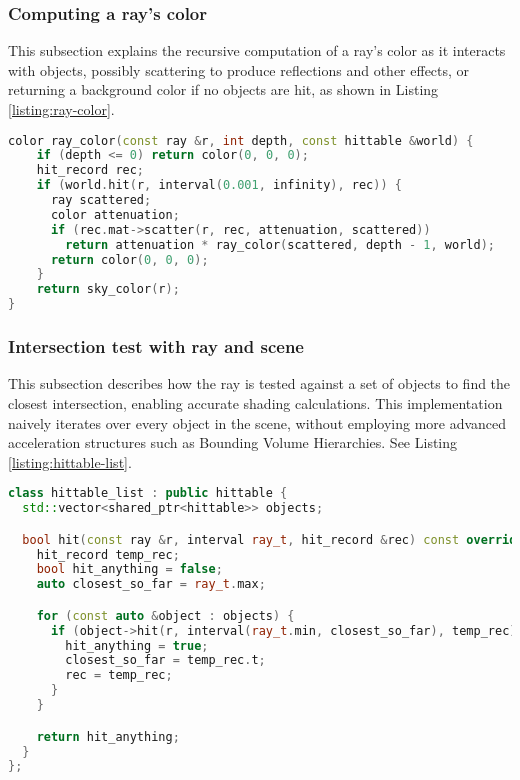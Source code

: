 \FloatBarrier
\subsubsection{Computing a ray's color}
This subsection explains the recursive computation of a ray’s color as it interacts with objects, possibly scattering to produce reflections and other effects, or returning a background color if no objects are hit, as shown in Listing \ref{listing:ray-color}.

\begin{lstlisting}[caption={\textbf{Computing a ray's color}},label={listing:ray-color}, name=ray-color, float=htbp, style=mystyle,language=C++]
color ray_color(const ray &r, int depth, const hittable &world) {
    if (depth <= 0) return color(0, 0, 0);
    hit_record rec;
    if (world.hit(r, interval(0.001, infinity), rec)) {
      ray scattered;
      color attenuation;
      if (rec.mat->scatter(r, rec, attenuation, scattered))
        return attenuation * ray_color(scattered, depth - 1, world);
      return color(0, 0, 0);
    }
    return sky_color(r);
}
\end{lstlisting}

\FloatBarrier
\subsubsection{Intersection test with ray and scene}
This subsection describes how the ray is tested against a set of objects to find the closest intersection, enabling accurate shading calculations. This implementation naively iterates over every object in the scene, without employing more advanced acceleration structures such as Bounding Volume Hierarchies\cite{Kay1986}. See Listing \ref{listing:hittable-list}.

\begin{lstlisting}[caption={\textbf{Hittable List Implementation}}, label={listing:hittable-list}, name=hittable-list, float=htbp, style=mystyle, language=C++]
class hittable_list : public hittable {
  std::vector<shared_ptr<hittable>> objects;

  bool hit(const ray &r, interval ray_t, hit_record &rec) const override {
    hit_record temp_rec;
    bool hit_anything = false;
    auto closest_so_far = ray_t.max;

    for (const auto &object : objects) {
      if (object->hit(r, interval(ray_t.min, closest_so_far), temp_rec)) {
        hit_anything = true;
        closest_so_far = temp_rec.t;
        rec = temp_rec;
      }
    }

    return hit_anything;
  }
};
\end{lstlisting}
